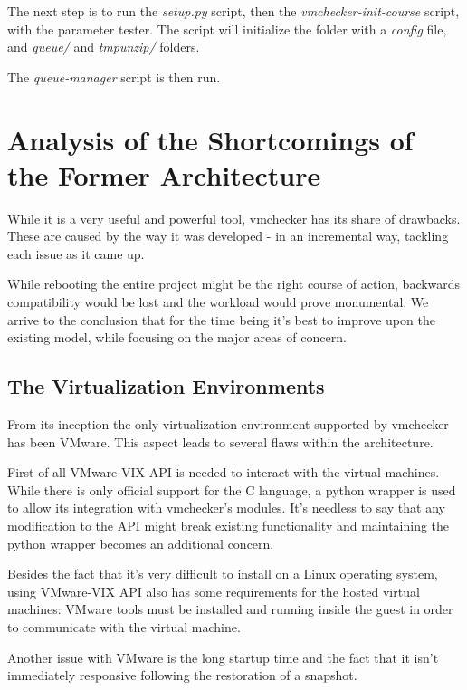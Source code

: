 The next step is to run the \textit{setup.py} script, then the \textit{vmchecker-init-course} script,
with the parameter tester. The script will initialize the folder with a {\it config} file,
and \textit{queue/} and \textit{tmpunzip/} folders.

The {\it queue-manager} script is then run. 

\section{Analysis of the Shortcomings of the Former Architecture}
\label{sec:vmc-analysis}

While it is a very useful and powerful tool, vmchecker has its share of drawbacks.
These are caused by the way it was developed - in an incremental way, tackling 
each issue as it came up. 

While rebooting the entire project might be the right course of action, 
backwards compatibility would be lost and the workload would 
prove monumental. We arrive to the conclusion that for the time being it's best
to improve upon the existing model, while focusing on the major areas of concern.

\subsection{The Virtualization Environments}
\label{sub-sec:vmc-analysis-env}

From its inception the only virtualization environment supported by vmchecker 
has been VMware. This aspect leads to several flaws within the architecture.

First of all VMware-VIX API is needed to interact with the virtual machines. 
While there is only official support for the C language, a python wrapper is
used to allow its integration with vmchecker's modules. It's needless to say
that any modification to the API might break existing functionality and 
maintaining the python wrapper becomes an additional concern.

Besides the fact that it's very difficult to install on a Linux operating system,
using VMware-VIX API also has some requirements for the hosted virtual machines:
VMware tools must be installed and running inside the guest in order to communicate
with the virtual machine.

Another issue with VMware is the long startup time and the fact that it isn't 
immediately responsive following the restoration of a snapshot.

